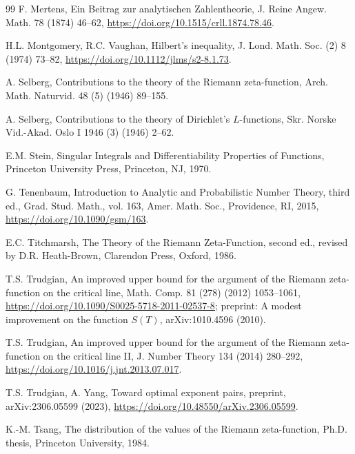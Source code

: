 \documentclass[preprint,12pt]{elsarticle}
\numberwithin{equation}{section}
\theoremstyle{plain}
\theoremstyle{definition}
\theoremstyle{remark}
\begin{document}
\begin{thebibliography}{99}
F. Mertens, Ein Beitrag zur analytischen Zahlentheorie, J. Reine Angew. Math. 78 (1874) 46--62, \href{https://doi.org/10.1515/crll.1874.78.46}{https://doi.org/10.1515/crll.1874.78.46}.

H.L. Montgomery, R.C. Vaughan, Hilbert's inequality, J. Lond. Math. Soc. (2) 8 (1974) 73--82, \href{https://doi.org/10.1112/jlms/s2-8.1.73}{https://doi.org/10.1112/jlms/s2-8.1.73}.

A. Selberg, Contributions to the theory of the Riemann zeta-function, Arch. Math. Naturvid. 48 (5) (1946) 89--155.

A. Selberg, Contributions to the theory of Dirichlet's $L$-functions, Skr. Norske Vid.-Akad. Oslo I 1946 (3) (1946) 2--62.

E.M. Stein, Singular Integrals and Differentiability Properties of Functions, Princeton University Press, Princeton, NJ, 1970.

G. Tenenbaum, Introduction to Analytic and Probabilistic Number Theory, third ed., Grad. Stud. Math., vol. 163, Amer. Math. Soc., Providence, RI, 2015, \href{https://doi.org/10.1090/gsm/163}{https://doi.org/10.1090/gsm/163}.

E.C. Titchmarsh, The Theory of the Riemann Zeta-Function, second ed., revised by D.R. Heath-Brown, Clarendon Press, Oxford, 1986.

T.S. Trudgian, An improved upper bound for the argument of the Riemann zeta-function on the critical line, Math. Comp. 81 (278) (2012) 1053--1061, \href{https://doi.org/10.1090/S0025-5718-2011-02537-8}{https://doi.org/10.1090/S0025-5718-2011-02537-8}; preprint: A modest improvement on the function $S(T)$, arXiv:1010.4596 (2010).

T.S. Trudgian, An improved upper bound for the argument of the Riemann zeta-function on the critical line II, J. Number Theory 134 (2014) 280--292, \href{https://doi.org/10.1016/j.jnt.2013.07.017}{https://doi.org/10.1016/j.jnt.2013.07.017}.

T.S. Trudgian, A. Yang, Toward optimal exponent pairs, preprint, arXiv:2306.05599 (2023), \href{https://doi.org/10.48550/arXiv.2306.05599}{https://doi.org/10.48550/arXiv.2306.05599}.

K.-M. Tsang, The distribution of the values of the Riemann zeta-function, Ph.D. thesis, Princeton University, 1984.

\end{thebibliography}
\end{document}
